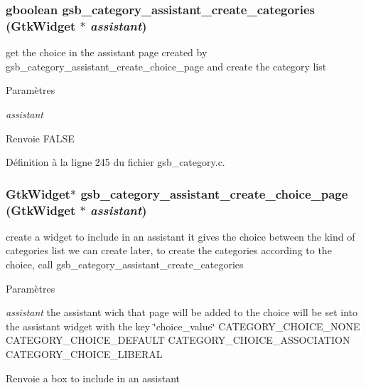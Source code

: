 \subsubsection[{gsb\_\-category\_\-assistant\_\-create\_\-categories}]{\setlength{\rightskip}{0pt plus 5cm}gboolean gsb\_\-category\_\-assistant\_\-create\_\-categories (GtkWidget $\ast$ {\em assistant})}\label{gsb__category_8h_a6f38ac76c4b1b44555742d71770eb83b}
get the choice in the assistant page created by gsb\_\-category\_\-assistant\_\-create\_\-choice\_\-page and create the category list


\begin{DoxyParams}{Paramètres}
\item[{\em assistant}]\end{DoxyParams}
\begin{DoxyReturn}{Renvoie}
FALSE 
\end{DoxyReturn}


Définition à la ligne 245 du fichier gsb\_\-category.c.

\subsubsection[{gsb\_\-category\_\-assistant\_\-create\_\-choice\_\-page}]{\setlength{\rightskip}{0pt plus 5cm}GtkWidget$\ast$ gsb\_\-category\_\-assistant\_\-create\_\-choice\_\-page (GtkWidget $\ast$ {\em assistant})}\label{gsb__category_8h_a6a84b628fc462846e25667e888c76dc7}
create a widget to include in an assistant it gives the choice between the kind of categories list we can create later, to create the categories according to the choice, call gsb\_\-category\_\-assistant\_\-create\_\-categories


\begin{DoxyParams}{Paramètres}
\item[{\em assistant}]the assistant wich that page will be added to the choice will be set into the assistant widget with the key \char`\"{}choice\_\-value\char`\"{} CATEGORY\_\-CHOICE\_\-NONE CATEGORY\_\-CHOICE\_\-DEFAULT CATEGORY\_\-CHOICE\_\-ASSOCIATION CATEGORY\_\-CHOICE\_\-LIBERAL\end{DoxyParams}
\begin{DoxyReturn}{Renvoie}
a box to include in an assistant 
\end{DoxyReturn}


